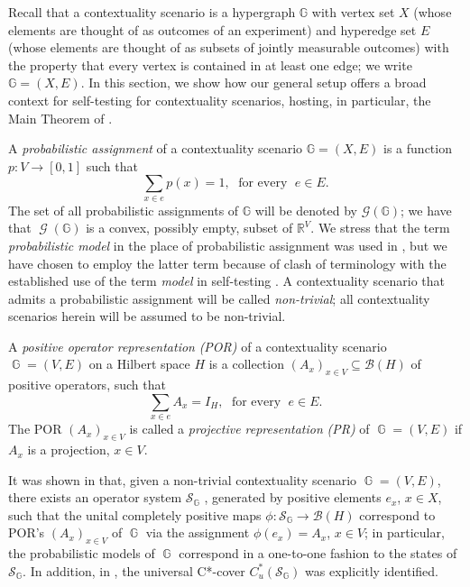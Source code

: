 \documentclass[11pt]{amsart}
\theoremstyle{definition}
\DeclareMathOperator{\Gg}{\mathcal{G}}
\DeclareMathOperator{\G}{\mathbb{G}}
\newcommand{\cl}[1]{\mathcal{#1}}
\newcommand{\bb}[1]{\mathbb{#1}}
\begin{document}
Recall \cite{acin-etal} that a contextuality scenario is a hypergraph $\bb{G}$ 
with vertex set $X$ (whose elements are thought of as outcomes of an experiment)
and hyperedge set $E$ (whose elements are thought of as subsets of jointly measurable outcomes) with the property that 
every vertex is contained in at least one edge; we write $\bb{G} = (X,E)$. 
In this section, we show how our general setup offers a broad 
context for self-testing for contextuality scenarios, hosting, in 
particular, the Main Theorem of \cite{brv-etal}. 

A \textit{probabilistic assignment} of a contextuality scenario $\bb{G} = (X,E)$ 
is a function $p : V \rightarrow [0,1]$ such that
$$    \sum_{x \in e}p(x)=1, \; \text{ for every } \; e \in E.$$
The set of all probabilistic assignments of $\bb{G}$ will be denoted by $\cl G(\bb{G})$; 
we have that $ \Gg(\bb{G})$ is a convex, possibly  empty, subset of $ \bb{R}^{V}$.
We stress that the term \emph{probabilistic model} in the place of 
probabilistic assignment was used in \cite{acin-etal}, but we have chosen 
to employ the latter term because of 
clash of terminology with the established use of the 
term \emph{model} in self-testing \cite{mps, pszz}. 
A contextuality scenario that admits a probabilistic assignment will be called \textit{non-trivial};
all contextuality scenarios herein will be assumed to be non-trivial.

A \textit{positive operator representation} \textit{(POR)} of 
a contextuality scenario $\G=(V,E)$ on a 
Hilbert space $H$ is a collection $ (A_{x})_{x\in V} \subseteq \cl B(H)$ of 
positive operators, such that 
$$     \sum_{x\in e} A_{x} = I_{H}, \; \text{ for every } \; e\in E.$$
The POR $ (A_{x})_{x\in V}$ is called a 
\textit{projective representation} \textit{(PR)} of $\G=(V,E)$ if 
$A_x$ is a projection, $x\in V$.


It was shown in \cite{act} that, given a 
non-trivial contextuality scenario $\G = (V,E)$, 
there exists an operator system $\cl S_{\bb{G}}$ , generated by 
positive elements $e_x$, $x\in X$, such that the unital completely positive maps
$\phi : \cl S_{\bb{G}}\to \cl B(H)$ correspond to POR's $(A_x)_{x\in V}$ of $\G$ via the 
assignment $\phi(e_x) = A_x$, $x\in V$; in particular, the probabilistic models of $\G$
correspond in a one-to-one fashion to the states of $\cl S_{\G}$. 
In addition, in \cite{act}, the universal C*-cover $C^*_u(\cl S_{\bb{G}})$ 
was explicitly identified. 
\end{document}
